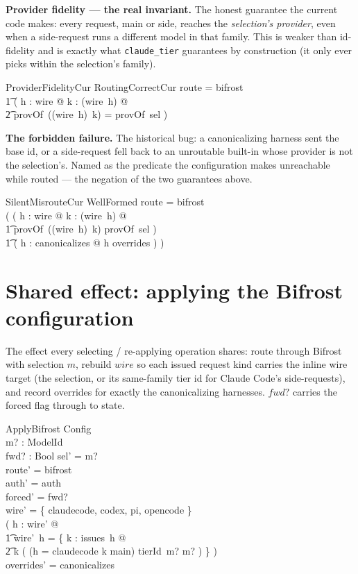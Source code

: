 \documentclass{article}
\begin{document}
\textbf{Provider fidelity --- the real invariant.} The honest guarantee the
current code makes: every request, main or side, reaches the \emph{selection's
provider}, even when a side-request runs a different model in that family.
This is weaker than id-fidelity and is exactly what \texttt{claude\_tier}
guarantees by construction (it only ever picks within the selection's family).

\begin{schema}{ProviderFidelityCur}
  RoutingCorrectCur
\where
  route = bifrost \implies \\
  \t1 ( \forall h : \dom wire @ \forall k : \dom (wire~h) @ \\
  \t2   provOf~((wire~h)~k) = provOf~sel )
\end{schema}

\textbf{The forbidden failure.} The historical bug: a canonicalizing harness
sent the base id, or a side-request fell back to an unroutable built-in whose
provider is not the selection's. Named as the predicate the configuration makes
unreachable while routed --- the negation of the two guarantees above.

\begin{schema}{SilentMisrouteCur}
  WellFormed
\where
  route = bifrost \\
  ( ( \exists h : \dom wire @ \exists k : \dom (wire~h) @ \\
  \t1   provOf~((wire~h)~k) \neq provOf~sel ) \lor \\
  \t1 ( \exists h : canonicalizes @ h \notin overrides ) )
\end{schema}

\section{Shared effect: applying the Bifrost configuration}

The effect every selecting / re-applying operation shares: route through
Bifrost with selection $m$, rebuild $wire$ so each issued request kind carries
the inline wire target (the selection, or its same-family tier id for Claude
Code's side-requests), and record overrides for exactly the canonicalizing
harnesses. $fwd?$ carries the forced flag through to state.

\begin{schema}{ApplyBifrost}
  \Delta Config \\
  m? : ModelId \\
  fwd? : Bool
\where
  sel' = m? \\
  route' = bifrost \\
  auth' = auth \\
  forced' = fwd? \\
  \dom wire' = \{ claudecode, codex, pi, opencode \} \\
  ( \forall h : \dom wire' @ \\
  \t1 wire'~h = \{ k : issues~h @ \\
  \t2   k \mapsto ( \IF (h = claudecode \land k \neq main) \THEN tierId~m? \ELSE m? ) \} ) \\
  overrides' = canonicalizes
\end{schema}
\end{document}
